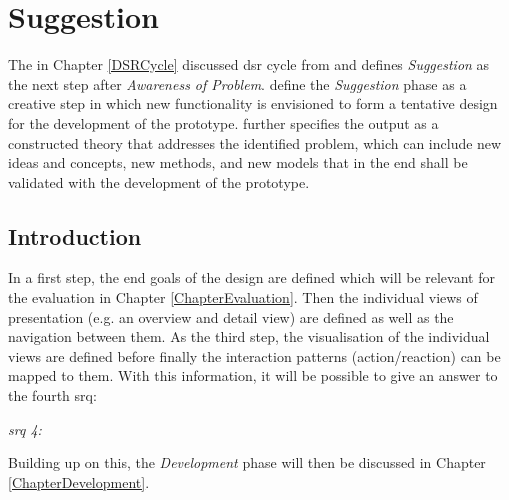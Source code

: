 
\chapter{Suggestion}

\label{ChapterSuggestion}

The in Chapter \ref{DSRCycle} discussed \gls{dsr} cycle from \cite{Vaishnavi2008} and \cite{Hevner2010} defines \textit{Suggestion} as the next step after \textit{Awareness of Problem}. \cite{Vaishnavi2008} define the \textit{Suggestion} phase as a creative step in which new functionality is envisioned to form a tentative design for the development of the prototype. \cite{Vaishnavi2008} further specifies the output as a constructed theory that addresses the identified problem, which can include new ideas and concepts, new methods, and new models that in the end shall be validated with the development of the prototype.


\section{Introduction}

In a first step, the end goals of the design are defined which will be relevant for the evaluation in Chapter \ref{ChapterEvaluation}. Then the individual views of presentation (e.g. an overview and detail view) are defined as well as the navigation between them. As the third step, the visualisation of the individual views are defined before finally the interaction patterns (action/reaction) can be mapped to them. With this information, it will be possible to give an answer to the fourth \gls{srq}:
\begin{framed}
 	\textit{\gls{srq} 4: \srqfourtext}
\end{framed}
Building up on this, the \textit{Development} phase will then be discussed in Chapter \ref{ChapterDevelopment}.



